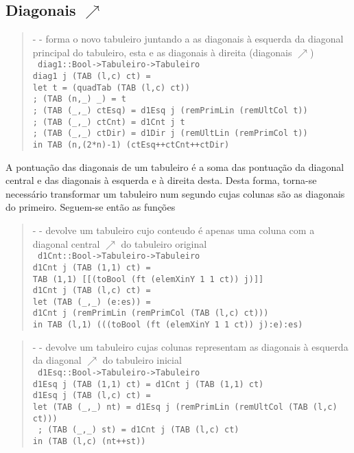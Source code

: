 \documentclass[a4paper,titlepage]{scrreprt}
\begin{document}
		\subsection{Diagonais $\nearrow$}
			\begin{quote}
				{\small - - forma o novo tabuleiro juntando a as diagonais à esquerda da diagonal principal do tabuleiro, esta e as diagonais à direita (diagonais $\nearrow$)\\}
				{\tt
				diag1::Bool->Tabuleiro->Tabuleiro\\
				diag1 j (TAB (l,c) ct) =\\
				let	t = (quadTab (TAB (l,c) ct))\\
				;	(TAB (n,\_) \_) = t\\
				;	(TAB (\_,\_) ctEsq) = d1Esq j (remPrimLin (remUltCol t))\\
				;	(TAB (\_,\_) ctCnt) = d1Cnt j t\\
				;	(TAB (\_,\_) ctDir) = d1Dir j (remUltLin (remPrimCol t))\\
				in	TAB (n,(2*n)-1) (ctEsq++ctCnt++ctDir)
				}
			\end{quote}
		A pontuação das diagonais de um tabuleiro é a soma das pontuação da diagonal central e das diagonais à esquerda e à direita desta.
		Desta forma, torna-se necessário transformar um tabuleiro num segundo cujas colunas são as diagonais do primeiro. Seguem-se então as funções
			\begin{quote}
				{\small - - devolve um tabuleiro cujo conteudo é apenas uma coluna com a diagonal central $\nearrow$ do tabuleiro original\\}
				{\tt
				d1Cnt::Bool->Tabuleiro->Tabuleiro\\
				d1Cnt j (TAB (1,1) ct) =\\
				TAB (1,1) [[(toBool (ft (elemXinY 1 1 ct)) j)]]\\
				d1Cnt j (TAB (l,c) ct) =\\
				{\small let	(TAB (\_,\_) (e:es)) =\\d1Cnt j (remPrimLin (remPrimCol (TAB (l,c) ct)))}\\
				in TAB (l,1) (((toBool (ft (elemXinY 1 1 ct)) j):e):es)
				}
			\end{quote}
			\begin{quote}
				{\small - - devolve um tabuleiro cujas colunas representam as diagonais à esquerda da diagonal $\nearrow$ do tabuleiro inicial\\}
				{\tt
				d1Esq::Bool->Tabuleiro->Tabuleiro\\
				d1Esq j (TAB (1,1) ct) = d1Cnt j (TAB (1,1) ct)\\
				d1Esq j (TAB (l,c) ct) =\\
				{\small let	(TAB (\_,\_) nt) = d1Esq j (remPrimLin (remUltCol (TAB (l,c) ct)))\\}
				;	(TAB (\_,\_) st) = d1Cnt j (TAB (l,c) ct)\\
				in	(TAB (l,c) (nt++st))
				}
			\end{quote}
\end{document}
